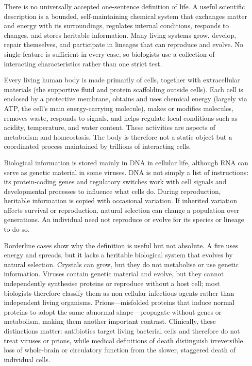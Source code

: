 \documentclass[11pt,oneside]{report}
\begin{document}
There is no universally accepted one-sentence definition of life. A useful
scientific description is a bounded, self-maintaining chemical system that
exchanges matter and energy with its surroundings, regulates internal
conditions, responds to changes, and stores heritable information. Many living
systems grow, develop, repair themselves, and participate in lineages that can
reproduce and evolve. No single feature is sufficient in every case, so
biologists use a collection of interacting characteristics rather than one
strict test.

Every living human body is made primarily of cells, together with extracellular
materials (the supportive fluid and protein scaffolding outside cells). Each
cell is enclosed by a protective membrane, obtains and uses chemical energy
(largely via ATP, the cell's main energy-carrying molecule), makes or modifies
molecules, removes waste, responds to signals, and helps regulate local
conditions such as acidity, temperature, and water content. These activities are
aspects of metabolism and homeostasis. The body
is therefore not a static object but a coordinated process maintained by
trillions of interacting cells.

Biological information is stored mainly in DNA in cellular life, although RNA
can serve as genetic material in some viruses. DNA is not simply a list of
instructions: its protein-coding genes and regulatory switches work with cell
signals and developmental processes to influence what cells do. During
reproduction, heritable information is copied with occasional variation. If
inherited variation affects survival or reproduction, natural selection can
change a population over generations. An individual need not reproduce or evolve
for its species or lineage to do so.

Borderline cases show why the definition is useful but not absolute. A fire
uses energy and spreads, but it lacks a heritable biological system that
evolves by natural selection. Crystals can grow, but they do not metabolise or
use genetic information. Viruses contain genetic material and evolve, but they
cannot independently synthesise proteins or reproduce without a host cell; most
biologists therefore classify them as non-cellular infectious agents rather
than independent living organisms. Prions—misfolded proteins that induce normal
proteins to adopt the same abnormal shape—propagate without genes or
metabolism, making them another important contrast. Clinically, these
distinctions matter: antibiotics target living bacterial cells and therefore do
not treat viruses or prions, while medical definitions of death distinguish
irreversible loss of whole-brain or circulatory function from the slower,
staggered death of individual cells.
\end{document}

